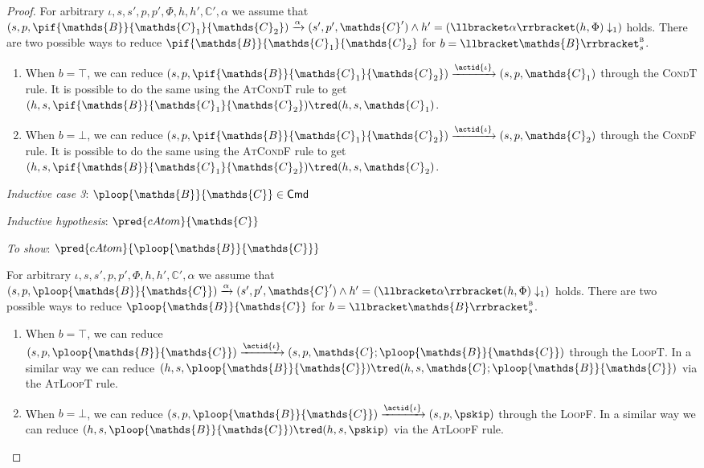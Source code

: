 \begin{lem}
{\begin{proof}
	For arbitrary $\iota, s, s', p, p', \Phi, h, h', \mathds{C}', \alpha$ we assume that $(s, p, \pif{\mathds{B}}{\mathds{C}_1}{\mathds{C}_2}) \xrightarrow{\alpha} (s', p', \mathds{C}') \land h' = \left( \llbracket \alpha \rrbracket(h, \Phi) \downarrow_1 \right)$ holds. There are two possible ways to reduce $\pif{\mathds{B}}{\mathds{C}_1}{\mathds{C}_2}$ for $b = \llbracket \mathds{B} \rrbracket_{s}^{\textsc{b}}$.
	\begin{enumerate}
	\item When $b = \top$, we can reduce $(s, p, \pif{\mathds{B}}{\mathds{C}_1}{\mathds{C}_2}) \xrightarrow{\actid{\iota}} (s, p, \mathds{C}_1)$ through the \textsc{CondT} rule. It is possible to do the same using the \textsc{AtCondT} rule to get $(h, s, \pif{\mathds{B}}{\mathds{C}_1}{\mathds{C}_2}) \tred (h, s, \mathds{C}_1)$.
	\item When $b = \bot$, we can reduce $(s, p, \pif{\mathds{B}}{\mathds{C}_1}{\mathds{C}_2}) \xrightarrow{\actid{\iota}} (s, p, \mathds{C}_2)$ through the \textsc{CondF} rule. It is possible to do the same using the \textsc{AtCondF} rule to get $(h, s, \pif{\mathds{B}}{\mathds{C}_1}{\mathds{C}_2}) \tred (h, s, \mathds{C}_2)$.
	\end{enumerate}
	
	\textit{Inductive case 3}: $\ploop{\mathds{B}}{\mathds{C}} \in \mathsf{Cmd}$
	
	\textit{Inductive hypothesis}: $\pred{cAtom}{\mathds{C}}$
	
	\textit{To show}: $\pred{cAtom}{\ploop{\mathds{B}}{\mathds{C}}}$
	
	For arbitrary $\iota, s, s', p, p', \Phi, h, h', \mathds{C}', \alpha$ we assume that $(s, p, \ploop{\mathds{B}}{\mathds{C}}) \xrightarrow{\alpha} (s', p', \mathds{C}') \land h' = \left( \llbracket \alpha \rrbracket(h, \Phi) \downarrow_1 \right)$ holds. There are two possible ways to reduce $\ploop{\mathds{B}}{\mathds{C}}$ for $b = \llbracket \mathds{B} \rrbracket_{s}^{\textsc{b}}$.
	\begin{enumerate}
	\item When $b = \top$, we can reduce $(s, p, \ploop{\mathds{B}}{\mathds{C}}) \xrightarrow{\actid{\iota}} (s, p, \mathds{C} ; \ploop{\mathds{B}}{\mathds{C}})$ through the \textsc{LoopT}. In a similar way we can reduce $(h, s, \ploop{\mathds{B}}{\mathds{C}}) \tred (h, s, \mathds{C} ; \ploop{\mathds{B}}{\mathds{C}})$ via the \textsc{AtLoopT} rule.
	\item When $b = \bot$, we can reduce $(s, p, \ploop{\mathds{B}}{\mathds{C}}) \xrightarrow{\actid{\iota}} (s, p, \pskip)$ through the \textsc{LoopF}. In a similar way we can reduce $(h, s, \ploop{\mathds{B}}{\mathds{C}}) \tred (h, s, \pskip)$ via the \textsc{AtLoopF} rule.
	\end{enumerate}
	\end{proof}
	}
\end{lem}

